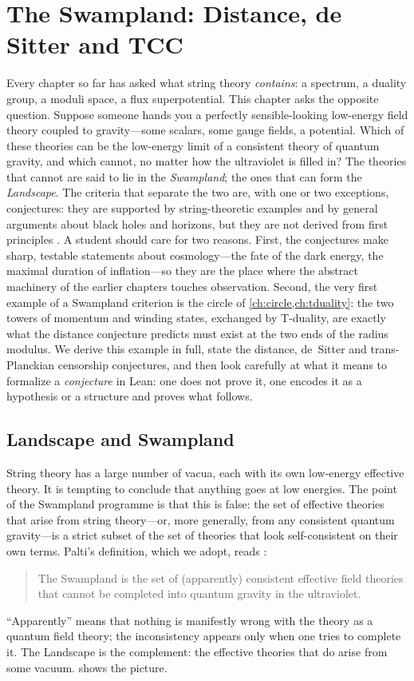 \chapter{The Swampland: Distance, de Sitter and TCC}\label{ch:swampland}

Every chapter so far has asked what string theory \emph{contains}: a spectrum, a duality group, a
moduli space, a flux superpotential. This chapter asks the opposite question. Suppose someone hands
you a perfectly sensible-looking low-energy field theory coupled to gravity---some scalars, some
gauge fields, a potential. Which of these theories can be the low-energy limit of a consistent
theory of quantum gravity, and which cannot, no matter how the ultraviolet is filled in? The
theories that cannot are said to lie in the \emph{Swampland}; the ones that can form the
\emph{Landscape}. The criteria that separate the two are, with one or two exceptions, conjectures:
they are supported by string-theoretic examples and by general arguments about black holes and
horizons, but they are not derived from first principles . A student
should care for two reasons. First, the conjectures make sharp, testable statements about
cosmology---the fate of the dark energy, the maximal duration of inflation---so they are the place
where the abstract machinery of the earlier chapters touches observation. Second, the very first
example of a Swampland criterion is the circle of \cref{ch:circle,ch:tduality}: the two towers of
momentum and winding states, exchanged by T-duality, are exactly what the distance conjecture
predicts must exist at the two ends of the radius modulus. We derive this example in full,
state the distance, de~Sitter and trans-Planckian censorship conjectures, and then look
carefully at what it means to formalize a \emph{conjecture} in Lean: one does not prove it, one
encodes it as a hypothesis or a structure and proves what follows.

\section{Landscape and Swampland}\label{sec:swampland:landscape}

String theory has a large number of vacua, each with its own low-energy effective theory. It is
tempting to conclude that anything goes at low energies. The point of the Swampland programme is
that this is false: the set of effective theories that arise from string theory---or, more
generally, from any consistent quantum gravity---is a strict subset of the set of theories that
look self-consistent on their own terms. Palti's definition, which we adopt, reads
:
\begin{quote}
The Swampland is the set of (apparently) consistent effective field theories that cannot be
completed into quantum gravity in the ultraviolet.
\end{quote}
``Apparently'' means that nothing is manifestly wrong with the theory as a quantum field theory;
the inconsistency appears only when one tries to complete it. The Landscape is the complement:
the effective theories that do arise from some vacuum.  shows the picture.

